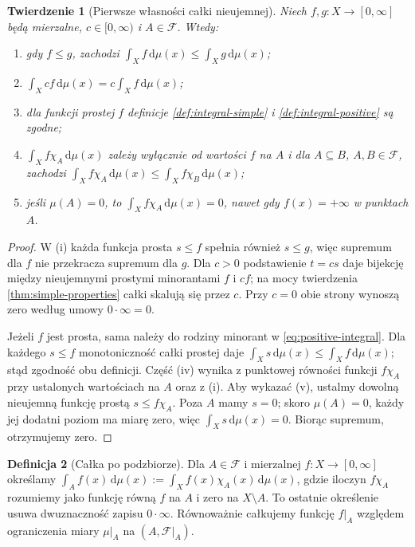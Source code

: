 \documentclass[11pt,a4paper,oneside]{book}
\numberwithin{equation}{chapter}
\theoremstyle{plain}
\newtheorem{twierdzenie}{Twierdzenie}[chapter]
\theoremstyle{definition}
\newtheorem{definicja}[twierdzenie]{Definicja}
\theoremstyle{remark}
\begin{document}
\begin{twierdzenie}[Pierwsze własności całki nieujemnej]
\label{thm:nonnegative-first-properties}
Niech $f,g:X\to[0,\infty]$ będą mierzalne,
$c\in[0,\infty)$ i $A\in\mathcal F$. Wtedy:
\begin{enumerate}[label=\textup{(\roman*)}]
\item gdy $f\le g$, zachodzi
$\int_X f\,\mathrm d\mu(x)\le\int_Xg\,\mathrm d\mu(x)$;
\item $\int_X cf\,\mathrm d\mu(x)=c\int_Xf\,\mathrm d\mu(x)$;
\item dla funkcji prostej $f$ definicje
\ref{def:integral-simple} i \ref{def:integral-positive}
są zgodne;
\item $\int_X f\chi_A\,\mathrm d\mu(x)$ zależy
wyłącznie od wartości $f$ na $A$ i dla
$A\subseteq B$, $A,B\in\mathcal F$, zachodzi
$\int_X f\chi_A\,\mathrm d\mu(x)\le
\int_Xf\chi_B\,\mathrm d\mu(x)$;
\item jeśli $\mu(A)=0$, to
$\int_X f\chi_A\,\mathrm d\mu(x)=0$,
nawet gdy $f(x)=+\infty$ w punktach $A$.
\end{enumerate}
\end{twierdzenie}
\begin{proof}
W (i) każda funkcja prosta $s\le f$ spełnia
również $s\le g$, więc supremum dla $f$
nie przekracza supremum dla $g$.
Dla $c>0$ podstawienie $t=cs$ daje bijekcję
między nieujemnymi prostymi minorantami $f$ i $cf$;
na mocy twierdzenia \ref{thm:simple-properties}
całki skalują się przez $c$. Przy $c=0$ obie
strony wynoszą zero według umowy $0\cdot\infty=0$.

Jeżeli $f$ jest prosta, sama należy do rodziny
minorant w \eqref{eq:positive-integral}. Dla każdego
$s\le f$ monotoniczność całki prostej daje
$\int_Xs\,\mathrm d\mu(x)\le\int_Xf\,\mathrm d\mu(x)$;
stąd zgodność obu definicji.
Część (iv) wynika z punktowej równości funkcji
$f\chi_A$ przy ustalonych wartościach na $A$
oraz z (i). Aby wykazać (v), ustalmy dowolną
nieujemną funkcję prostą $s\le f\chi_A$.
Poza $A$ mamy $s=0$; skoro $\mu(A)=0$,
każdy jej dodatni poziom ma miarę zero, więc
$\int_Xs\,\mathrm d\mu(x)=0$.
Biorąc supremum, otrzymujemy zero.
\end{proof}

\begin{definicja}[Całka po podzbiorze]
\label{def:integral-over-set}
Dla $A\in\mathcal F$ i mierzalnej $f:X\to[0,\infty]$
określamy
$\int_A f(x)\,\mathrm d\mu(x):=
\int_X f(x)\chi_A(x)\,\mathrm d\mu(x)$,
gdzie iloczyn $f\chi_A$ rozumiemy jako funkcję
równą $f$ na $A$ i zero na $X\setminus A$.
To ostatnie określenie usuwa dwuznaczność zapisu
$0\cdot\infty$. Równoważnie całkujemy funkcję
$f|_A$ względem ograniczenia miary $\mu|_A$
na $(A,\mathcal F|_A)$.
\end{definicja}
\end{document}
